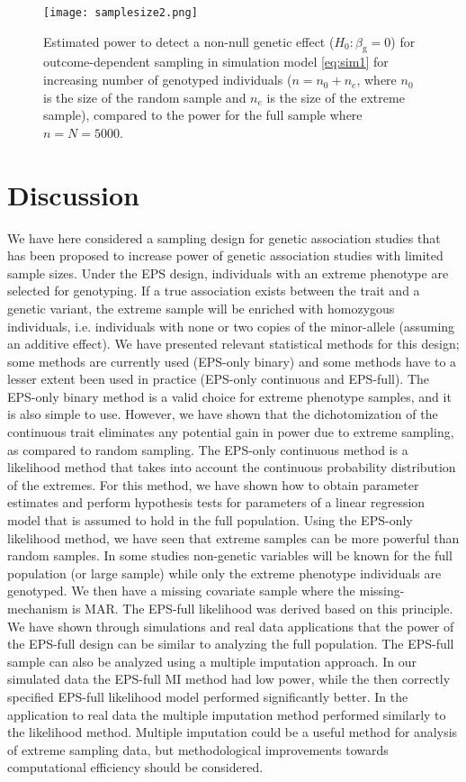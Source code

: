 \documentclass[10pt,a4paper]{article}
\begin{document}
\begin{figure}[h]
	\centering
	\texttt{[image: samplesize2.png]}
	\caption{Estimated power to detect a non-null genetic effect ($H_0: \beta_{\text{g}} = 0$) for outcome-dependent sampling in simulation model \eqref{eq:sim1} for increasing number of genotyped individuals ($n = n_0 + n_e$, where $n_0$ is the size of the random sample and $n_e$ is the size of the extreme sample), compared to the power for the full sample where $n=N=5000$.}
	\label{fig:samplesize2}
\end{figure}

\section{Discussion}
We have here considered a sampling design for genetic association studies that has been proposed to increase power of genetic association studies with limited sample sizes. Under the EPS design, individuals with an extreme phenotype are selected for genotyping. If a true association exists between the trait and a genetic variant, the extreme sample will be enriched with homozygous individuals, i.e. individuals with none or two copies of the minor-allele (assuming an additive effect). We have presented relevant statistical methods for this design; some methods are currently used (EPS-only binary) and some methods have to a lesser extent been used in practice (EPS-only continuous and EPS-full). The EPS-only binary method is a valid choice for extreme phenotype samples, and it is also simple to use. However, we have shown that the dichotomization of the continuous trait eliminates any potential gain in power due to extreme sampling, as compared to random sampling. The EPS-only continuous method is a likelihood method that takes into account the continuous probability distribution of the extremes. For this method, we have shown how to obtain parameter estimates and perform hypothesis tests for parameters of a linear regression model that is assumed to hold in the full population. Using the EPS-only likelihood method, we have seen that extreme samples can be more powerful than random samples. In some studies non-genetic variables will be known for the full population (or large sample) while only the extreme phenotype individuals are genotyped. We then have a missing covariate sample where the missing-mechanism is MAR. The EPS-full likelihood was derived based on this principle. We have shown through simulations and real data applications that the power of the EPS-full design can be similar to analyzing the full population. The EPS-full sample can also be analyzed using a multiple imputation approach. In our simulated data the EPS-full MI method had low power, while the then correctly specified EPS-full likelihood model performed significantly better. In the application to real data the multiple imputation method performed similarly to the likelihood method. Multiple imputation could be a useful method for analysis of extreme sampling data, but methodological improvements towards computational efficiency should be considered.
\end{document}
